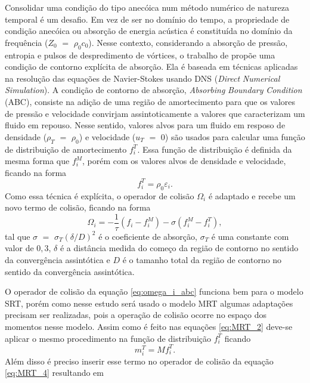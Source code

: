 Consolidar uma condição do tipo anecóica num método numérico de natureza temporal é um desafio. Em vez de ser no domínio do tempo, a propriedade de condição anecóica ou absorção de energia acústica é constituída no domínio da frequência ($Z_{0}$ $=$ $\rho_{0}c_{0}$). Nesse contexto, considerando a absorção de pressão, entropia e pulsos de despredimento de vórtices, o trabalho de  propõe uma condição de contorno explícita de absorção. Ela é baseada em técnicas aplicadas na resolução das equações de Navier-Stokes usando DNS (\textit{Direct} \textit{Numerical} \textit{Simulation}). A condição de contorno de absorção, \textit{Absorbing} \textit{Boundary} \textit{Condition} (ABC), consiste na adição de uma região de amortecimento para que os valores de pressão e velocidade convirjam assintoticamente a valores que caracterizam um fluido em repouso. Nesse sentido, valores alvos para um fluido em resposo de densidade ($\rho_{T}$ $=$ $\rho_{0}$) e velocidade (\textbf{$u_{T}$} $=$ $0$) são usados para calcular uma função de distribuição de amortecimento $f_{i}^{T}$. Essa função de distribuição é definida da mesma forma que $f_{i}^{M}$, porém com os valores alvos de densidade e velocidade, ficando na forma
\begin{equation}
  f_{i}^{T} = \rho_{0}\varepsilon_{i}.
  \label{eq:f_alvo}
\end{equation}
Como essa técnica é explícita, o operador de colisão $\Omega_{i}$ é adaptado e recebe um novo termo de colisão, ficando na forma
\begin{equation}
  \Omega_{i} = -\frac{1}{\tau}(f_{i} - f_{i}^{M}) - \sigma(f_{i}^{M} - f_{i}^{T}),
  \label{eq:omega_i_abc}
\end{equation}
tal que $\sigma$ $=$ $\sigma_{T}(\delta/D)^{2}$ é o coeficiente de absorção, $\sigma_{T}$ é uma constante com valor de $0,3$, $\delta$ é a distância medida do começo da região de contorno no sentido da convergência assintótica e $D$ é o tamanho total da região de contorno no sentido da convergência assintótica.

O operador de colisão da equação \ref{eq:omega_i_abc} funciona bem para o modelo SRT, porém como nesse estudo será usado o modelo MRT algumas adaptações precisam ser realizadas, pois a operação de colisão ocorre no espaço dos momentos nesse modelo. Assim como é feito nas equações \ref{eq:MRT_2} deve-se aplicar o mesmo procedimento na função de distribuição $f_{i}^{T}$ ficando
\begin{equation}
  m_{i}^{T} = \textbf{$M$}f_{i}^{T}.
  \label{eq:abc_mrt_1}
\end{equation}
Além disso é preciso inserir esse termo no operador de colisão da equação \ref{eq:MRT_4} resultando em 

